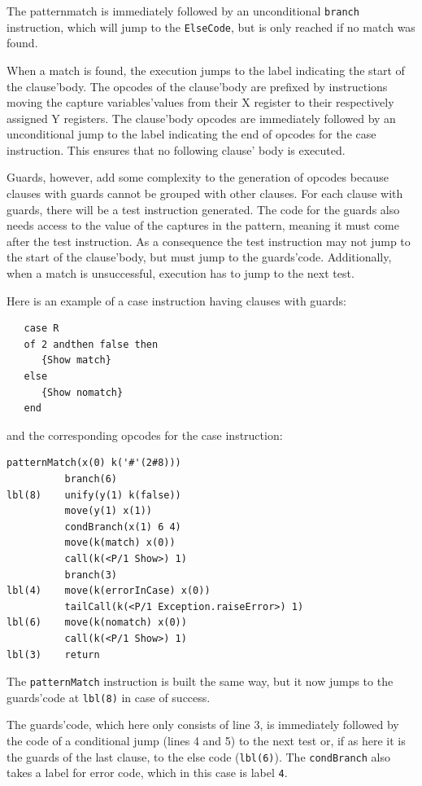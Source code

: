 \documentclass[a4paper]{memoir}
\begin{document}
The patternmatch is immediately followed by an unconditional \lstinline!branch! instruction,
which will jump to the \lstinline!ElseCode!, but is only reached if no match was found.

When a match is found, the execution jumps to the label indicating the start of the clause'body.
The opcodes of the clause'body are prefixed by instructions moving the capture
variables'values from their X register to their respectively assigned Y
registers.
The clause'body opcodes are immediately followed by an unconditional jump to
the label indicating the end of opcodes for the case instruction. This ensures
that no following clause' body is executed.

Guards, however, add some complexity to the generation of opcodes because clauses with guards cannot
be grouped with other clauses. For each clause with guards, there will be a
test instruction generated. The code for the guards also needs access
to the value of the captures in the pattern, meaning it must come after the
test instruction. As a consequence the test instruction may not jump to the start
of the clause'body, but must jump to the guards'code. Additionally, when a match
is unsuccessful, execution has to jump to the next test.

Here is an example of a case instruction having clauses with guards:
\begin{lstlisting}
   case R
   of 2 andthen false then
      {Show match}
   else
      {Show nomatch}
   end
\end{lstlisting}

and the corresponding opcodes for the case instruction:

\lstset{numbers=left, numberstyle=\tiny, stepnumber=1, numbersep=5pt}
\begin{lstlisting}[firstnumber=1]
          patternMatch(x(0) k('#'(2#8)))
          branch(6)
lbl(8)    unify(y(1) k(false))
          move(y(1) x(1))
          condBranch(x(1) 6 4)
          move(k(match) x(0))
          call(k(<P/1 Show>) 1)
          branch(3)
lbl(4)    move(k(errorInCase) x(0))
          tailCall(k(<P/1 Exception.raiseError>) 1)
lbl(6)    move(k(nomatch) x(0))
          call(k(<P/1 Show>) 1)
lbl(3)    return
\end{lstlisting}
\lstset{numbers=none}
The \lstinline!patternMatch! instruction is built the same way, but
it now jumps to the guards'code at \lstinline!lbl(8)! in case of
success. 

The guards'code, which here only consists of line 3, is immediately
followed by the code of a conditional jump (lines 4 and 5) to the next test or, if as here it is the guards
of the last clause, to the else code (\lstinline!lbl(6)!). The \lstinline!condBranch!
also takes a label for error code, which in this case is label \lstinline!4!.
\end{document}
